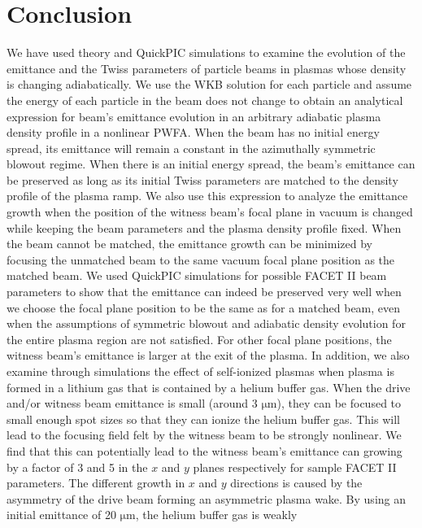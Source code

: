 \documentclass[%
reprint, superscriptaddress,
 amsmath,amssymb, aps,
prstab,
]{revtex4-2}
\begin{document}
\section{Conclusion} We have used theory and QuickPIC simulations to examine the evolution of the emittance and the Twiss parameters of particle beams in plasmas whose density is changing adiabatically. We use the WKB solution for each particle and assume the energy of each particle in the beam does not change
to obtain an analytical expression for beam's emittance evolution in an
arbitrary adiabatic plasma density profile in a nonlinear PWFA. When the
beam has no initial energy spread, its emittance will remain a constant in the azimuthally symmetric  blowout regime.
When there is an initial energy spread, the beam's emittance can be
preserved as long as its initial Twiss parameters are matched to the density profile of the plasma
ramp. We also use this expression to analyze the emittance
growth when the position of the witness beam's focal plane in vacuum is changed while keeping the beam
parameters and the plasma density profile fixed. When the beam
cannot be matched, the emittance growth can be minimized by focusing the
unmatched beam to the same vacuum focal plane position as the matched
beam. We used QuickPIC simulations for 
possible FACET II beam parameters to show that the emittance can indeed be
preserved very well when we choose the focal plane position to be the same as
for a matched beam, even when the assumptions of symmetric blowout and adiabatic density evolution for the entire plasma region are not satisfied. 
For other focal
plane positions, the witness beam's emittance is larger at the exit
of the plasma. In addition, we also examine through  simulations the effect of self-ionized plasmas when plasma is formed in a lithium gas that is contained by a helium buffer gas. When
the drive and/or witness beam emittance is small (around 3 $\mathrm{\mu m}$), they can be focused to small enough spot sizes so that they can
ionize the helium buffer gas. This will lead to the focusing field felt by the witness
beam to be strongly nonlinear. We find that this can potentially lead to the witness beam's emittance
can growing by a factor of 3 and 5 in the $x$ and $y$ planes respectively for sample FACET II parameters. The different growth in $x$ and $y$ directions is caused by the asymmetry of the
drive beam forming an asymmetric plasma wake. By using an initial
emittance of 20 $\mathrm{\mu m}$, the helium buffer gas is weakly
\end{document}
